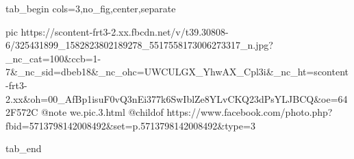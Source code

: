  
 
 
 
 

\ifcmt
  tab_begin cols=3,no_fig,center,separate

     pic https://scontent-frt3-2.xx.fbcdn.net/v/t39.30808-6/325431899_1582823802189278_5517558173006273317_n.jpg?_nc_cat=100&ccb=1-7&_nc_sid=dbeb18&_nc_ohc=UWCULGX_YhwAX_Cpl3i&_nc_ht=scontent-frt3-2.xx&oh=00_AfBp1isuF0vQ3nEi377k6SwIblZe8YLvCKQ23dPsYLJBCQ&oe=642F572C
		 @note we.pic.3.html
		 @childof https://www.facebook.com/photo.php?fbid=5713798142008492&set=p.5713798142008492&type=3

  tab_end
\fi
